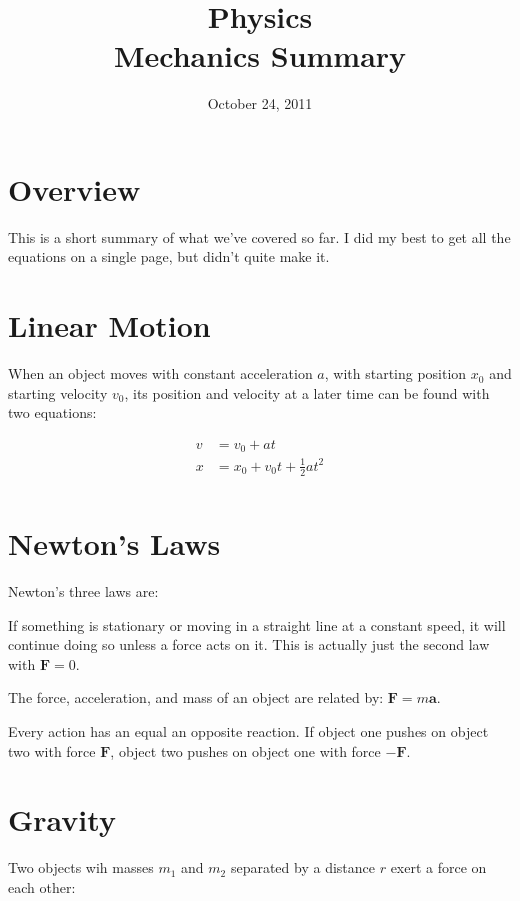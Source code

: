 \documentclass{exam}
\title{Physics \\ Mechanics Summary}
\date{October 24, 2011}
\begin{document}
\maketitle

 
\section{Overview}
This is a short summary of what we've covered so far.  I did my best to get all the equations on a
single page, but didn't quite make it.

\section{Linear Motion}

When an object moves with constant acceleration $a$, with starting position $x_0$ and starting velocity $v_0$, its position
and velocity at a later time can be found with two equations:

\begin{align*}
  v &= v_0 + at \\
  x &= x_0 + v_0t + \frac{1}{2}at^2 \\
\end{align*}

\section{Newton's Laws}

Newton's three laws are:
\begin{enumerate*}

\item If something is stationary or moving in a straight line at a constant speed, it will continue doing so unless a
  force acts on it.  This is actually just the second law with $\mathbf{F} = 0$.

\item The force, acceleration, and mass of an object are related by: $\mathbf{F} = m \mathbf{a}$.

\item Every action has an equal an opposite reaction.  If object one pushes on object two with force $\mathbf{F}$, object
  two pushes on object one with force $-\mathbf{F}$.

\end{enumerate*}

\section{Gravity}
Two objects wih masses $m_1$ and $m_2$ separated by a distance $r$ exert a force on each other:
\end{document}
